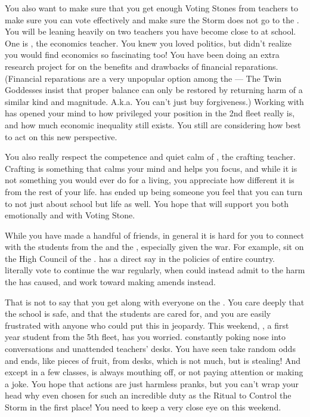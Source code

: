 \documentclass[char]{GL2020}
\begin{document}
You also want to make sure that you get enough Voting Stones from teachers to make sure you can vote effectively and make sure the Storm does not go to the \pShip{}. You will be leaning heavily on two teachers you have become close to at school. One is \cChupSecond{\full}, the economics teacher. You knew you loved politics, but didn’t realize you would find economics so fascinating too! You have been doing an extra research project for \cChupSecond{\them} on the benefits and drawbacks of financial reparations. (Financial reparations are a very unpopular option among the \pShippies{} — The Twin Goddesses insist that proper balance can only be restored by returning harm of a similar kind and magnitude. A.k.a. You can’t just buy forgiveness.) Working with \cChupSecond{\them} has opened your mind to how privileged your position in the 2nd fleet really is, and how much economic inequality still exists. You still are considering how best to act on this new perspective. 

You also really respect the competence and quiet calm of \cPirate{\full}, the crafting teacher. Crafting is something that calms your mind and helps you focus, and while it is not something you would ever do for a living, you appreciate how different it is from the rest of your life. \cPirate{} has ended up being someone you feel that you can turn to not just about school but life as well. You hope that \cPirate{\they} will support you both emotionally and with \cPirate{\their} Voting Stone.  

While you have made a handful of friends, in general it is hard for you to connect with the students from the \pTech{} and the \pFarm{}, especially given the war. For example, \cTechStar{\full} sit\cTechStar{\verbs} on the High Council of the \pTech{}. \cTechStar{} has a direct say in the policies of \cTechStar{\their} entire country. \cTechStar{\They} literally vote\cTechStar{\verbs} to continue the war regularly, when \cTechStar{\they} could instead admit to the harm the \pTech{} has caused, and work toward making amends instead. 

That is not to say that you get along with everyone on the \pShip{}. You care deeply that the school is safe, and that the students are cared for, and you are easily frustrated with anyone who could put this in jeopardy. This weekend, \cPirateChild{\full}, a first year student from the 5th fleet, has you worried. \cPirateChild{\Theyare} constantly poking \cPirateChild{\their} nose into conversations and unattended teachers’ desks. You have seen \cPirateChild{\them} take random odds and ends, like pieces of fruit, from desks, which is not much, but is stealing! And except in a few classes, \cPirateChild{} is always mouthing off, or not paying attention or making a joke. You hope that \cPirateChild{\their} actions are just harmless pranks, but you can’t wrap your head why \cPirateChild{\theywere} even chosen for such an incredible duty as the Ritual to Control the Storm in the first place! You need to keep a very close eye on \cPirateChild{\them} this weekend.
\end{document}

